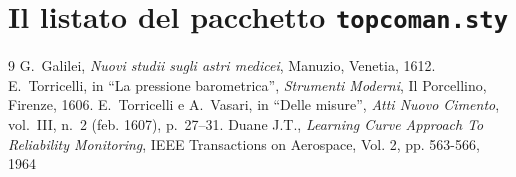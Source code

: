 \documentclass[%
    corpo=13pt,
    twoside,
    oldstyle,
    autoretitolo,
    greek,
    evenboxes,
    nocenterfolio,
    nocenterhead,
]{toptesi}
\begin{document}
\chapter{Il listato del pacchetto \texttt{topcoman.sty}}


\begin{thebibliography}{9}
 G.~Galilei, {\em Nuovi studii sugli astri medicei}, Manuzio,
        Venetia, 1612.
 E.~Torricelli, in ``La pressione barometrica'', {\em Strumenti
        Moderni}, Il Porcellino, Firenze, 1606.
 E.~Torricelli e A.~Vasari, in ``Delle misure'', {\em Atti Nuovo
        Cimento}, vol.~III, n.~2 (feb. 1607), p.~27--31.
 Duane J.T., \emph{Learning Curve Approach To Reliability 
		Monitoring}, IEEE Transactions on Aerospace, Vol. 2, pp. 563-566, 1964
\end{thebibliography}
\end{document}

